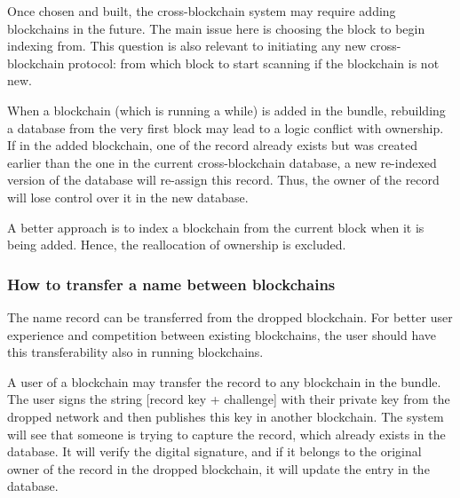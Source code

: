 \begin{multicols}{2}
\vspace{-.3cm}

Once chosen and built, the cross-blockchain system may require adding blockchains in the future. The main issue here is choosing the block to begin indexing from. This question is also relevant to initiating any new cross-blockchain protocol: from which block to start scanning if the blockchain is not new.

\vspace{-.1cm}

When a blockchain (which is running a while) is added in the bundle, rebuilding a database from the very first block may lead to a logic conflict with ownership. If in the added blockchain, one of the record already exists but was created earlier than the one in the current cross-blockchain database, a new re-indexed version of the database will re-assign this record. Thus, the owner of the record will lose control over it in the new database.

\vspace{-.1cm}

A better approach is to index a blockchain from the current block when it is being added. Hence, the reallocation of ownership is excluded.

\vspace{-.7cm}

\subsubsection{How to transfer a name between blockchains}\label{subsubsec-4.2.e}

\vspace{-.4cm}

The name record can be transferred from the dropped blockchain. For better user experience and competition between existing blockchains, the user should have this transferability also in running blockchains.

\vspace{-.1cm}

A user of a blockchain may transfer the record to any blockchain in the bundle. The user signs the string [record key + challenge] with their private key from the dropped network and then publishes this key in another blockchain. The system will see that someone is trying to capture the record, which already exists in the database. It will verify the digital signature, and if it belongs to the original owner of the record in the dropped blockchain, it will update the entry in the database.


\end{multicols}
